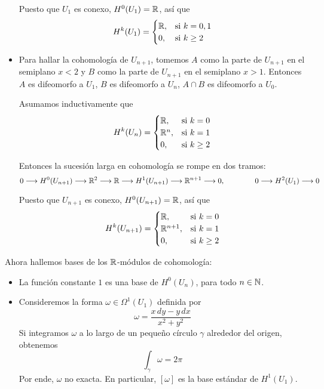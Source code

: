 \begin{solution}
\begin{itemize}
    Puesto que $U_1$ es conexo, $H^0(U_1) = \mathbb R$, así que
    $$
    H^k(U_1) =
        \begin{cases}
            \mathbb R, & \text{si } k = 0, 1 \\
            0, & \text{si } k \ge 2
        \end{cases}
    $$
    
    \item Para hallar la cohomología de $U_{n+1}$, tomemos $A$ como la parte de $U_{n+1}$ en el semiplano $x < 2$ y $B$ como la parte de $U_{n+1}$ en el semiplano $x > 1$. Entonces $A$ es difeomorfo a $U_1$, $B$ es difeomorfo a $U_n$, $A \cap B$ es difeomorfo a $U_0$.
    
    Asumamos inductivamente que
    $$
    H^k(U_n) =
        \begin{cases}
            \mathbb R, & \text{si } k = 0 \\
            \mathbb R^n, & \text{si } k = 1 \\
            0, & \text{si } k \ge 2
        \end{cases}
    $$
    
    Entonces la sucesión larga en cohomología se rompe en dos tramos:
    $$0 \longrightarrow H^0(U_{n+1}) \longrightarrow \mathbb R^2 \longrightarrow \mathbb R \longrightarrow H^1(U_{n+1}) \longrightarrow \mathbb R^{n+1} \longrightarrow 0, \qquad \qquad 0 \longrightarrow H^2(U_1) \longrightarrow 0$$
    
    Puesto que $U_{n+1}$ es conexo, $H^0(U_{n+1}) = \mathbb R$, así que
    $$
    H^k(U_{n+1}) =
        \begin{cases}
            \mathbb R, & \text{si } k = 0 \\
            \mathbb R^{n+1}, & \text{si } k = 1 \\
            0, & \text{si } k \ge 2
        \end{cases}
    $$
\end{itemize}
Ahora hallemos bases de los $\mathbb R$-módulos de cohomología:
\begin{itemize}
    \item La función constante $1$ es una base de $H^0(U_n)$, para todo $n \in \mathbb N$.
    
    \item Consideremos la forma $\omega \in \Omega^1(U_1)$ definida por
    $$\omega = \frac {x \, dy - y \, dx} {x^2 + y^2}$$
    Si integramos $\omega$ a lo largo de un pequeño círculo $\gamma$ alrededor del origen, obtenemos
    $$\int_\gamma \omega = 2\pi$$
    Por ende, $\omega$ no exacta. En particular, $[\omega]$ es la base estándar de $H^1(U_1)$.
    

\end{itemize}
\end{solution}
